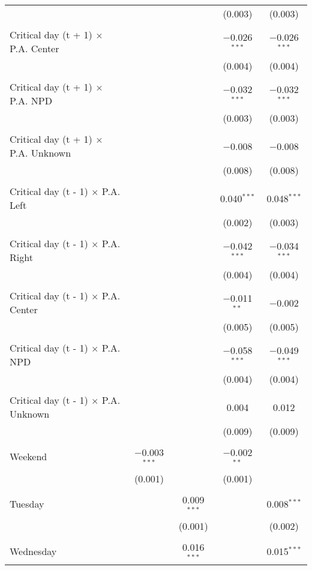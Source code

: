 \documentclass[
]{article}
\begin{document}
\begin{table}[!htbp]
{\begin{tabular}{@{\extracolsep{5pt}}lcccc}
  &  &  & (0.003) & (0.003) \\ 
  & & & & \\ 
 Critical day (t + 1) $\times$ P.A. Center &  &  & $-$0.026$^{***}$ & $-$0.026$^{***}$ \\ 
  &  &  & (0.004) & (0.004) \\ 
  & & & & \\ 
 Critical day (t + 1) $\times$ P.A. NPD &  &  & $-$0.032$^{***}$ & $-$0.032$^{***}$ \\ 
  &  &  & (0.003) & (0.003) \\ 
  & & & & \\ 
 Critical day (t + 1) $\times$ P.A. Unknown &  &  & $-$0.008 & $-$0.008 \\ 
  &  &  & (0.008) & (0.008) \\ 
  & & & & \\ 
 Critical day (t - 1) $\times$ P.A. Left &  &  & 0.040$^{***}$ & 0.048$^{***}$ \\ 
  &  &  & (0.002) & (0.003) \\ 
  & & & & \\ 
 Critical day (t - 1) $\times$ P.A. Right &  &  & $-$0.042$^{***}$ & $-$0.034$^{***}$ \\ 
  &  &  & (0.004) & (0.004) \\ 
  & & & & \\ 
 Critical day (t - 1) $\times$ P.A. Center &  &  & $-$0.011$^{**}$ & $-$0.002 \\ 
  &  &  & (0.005) & (0.005) \\ 
  & & & & \\ 
 Critical day (t - 1) $\times$ P.A. NPD &  &  & $-$0.058$^{***}$ & $-$0.049$^{***}$ \\ 
  &  &  & (0.004) & (0.004) \\ 
  & & & & \\ 
 Critical day (t - 1) $\times$ P.A. Unknown &  &  & 0.004 & 0.012 \\ 
  &  &  & (0.009) & (0.009) \\ 
  & & & & \\ 
 Weekend & $-$0.003$^{***}$ &  & $-$0.002$^{**}$ &  \\ 
  & (0.001) &  & (0.001) &  \\ 
  & & & & \\ 
 Tuesday &  & 0.009$^{***}$ &  & 0.008$^{***}$ \\ 
  &  & (0.001) &  & (0.002) \\ 
  & & & & \\ 
 Wednesday &  & 0.016$^{***}$ &  & 0.015$^{***}$ \\ 

\end{tabular}}
\end{table}
\end{document}
